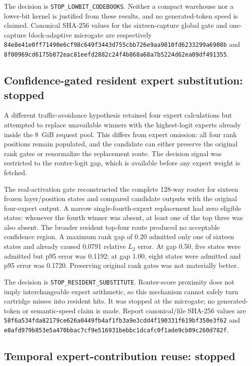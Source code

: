 The decision is \texttt{STOP\_LOWBIT\_CODEBOOKS}.  Neither a compact warehouse
nor a lower-bit kernel is justified from these results, and no generated-token
speed is claimed.  Canonical SHA-256 values for the sixteen-capture global gate
and one-capture block-adaptive microgate are respectively
\texttt{84e8e41e0ff71490e6cf98c649f3443d755cbb726e9aa9810fd6233299a6908b}
and
\texttt{8f00969cd6175b872eac81eefd2882c24f4b868a68a7b5224d62ea09df491355}.

\subsection{Confidence-gated resident expert substitution: stopped}

A different traffic-avoidance hypothesis retained four expert calculations but
attempted to replace unavailable winners with the highest-logit experts already
inside the 8~GiB request pool.  This differs from expert omission: all four
rank positions remain populated, and the candidate can either preserve the
original rank gates or renormalize the replacement route.  The decision signal
was restricted to the router-logit gap, which is available before any expert
weight is fetched.

The real-activation gate reconstructed the complete 128-way router for sixteen
frozen layer/position states and compared candidate outputs with the original
four-expert output.  A narrow single-fourth-expert replacement had zero eligible
states: whenever the fourth winner was absent, at least one of the top three was
also absent.  The broader resident top-four route produced no acceptable
confidence region.  A maximum rank gap of 0.20 admitted only one of sixteen
states and already caused 0.0791 relative $L_2$ error.  At gap 0.50, five states
were admitted but p95 error was 0.1192; at gap 1.00, eight states were admitted
and p95 error was 0.1720.  Preserving original rank gates was not materially
better.

The decision is \texttt{STOP\_RESIDENT\_SUBSTITUTE}.  Router-score proximity
does not imply interchangeable expert arithmetic, so this mechanism cannot
safely turn cartridge misses into resident hits.  It was stopped at the
microgate; no generated-token or semantic-speed claim is made.  Report
canonical/file SHA-256 values are
\texttt{58f6a534fda82179ce626a0449fb4af1fb3a9e3cdd4f190331f619bf350e3f62}
and
\texttt{e8afd979b853e5a470bbac7cf9e516931bebbc1dcafc0f1ade9cb09c260d782f}.

\subsection{Temporal expert-contribution reuse: stopped}


